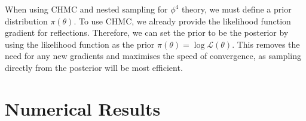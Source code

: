 \documentclass[11pt]{article}
\begin{document}
    When using CHMC and nested sampling for $\phi^4$ theory, we must define a prior distribution $\pi(\theta)$.
    To use CHMC, we already provide the likelihood function gradient for reflections.
    Therefore, we can set the prior to be the posterior by using the likelihood function as the
    prior $\pi(\theta) = \log \mathcal{L}(\theta)$.
    This removes the need for any new gradients and maximises the speed of convergence, as sampling directly from the
    posterior will be most efficient.

    \section{Numerical Results}\label{sec:numerical_results}
\end{document}
